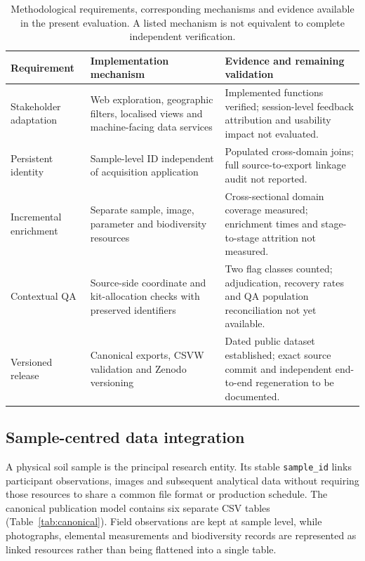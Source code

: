 \documentclass[11pt,a4paper]{article}
\newcommand{\code}[1]{\texttt{#1}}
\begin{document}
\begin{table}[htbp]
\centering\small
\caption{Methodological requirements, corresponding mechanisms and evidence available in the present evaluation. A listed mechanism is not equivalent to complete independent verification.}
\label{tab:requirements}
\begin{tabularx}{\linewidth}{@{}p{2.5cm}p{4.0cm}X@{}}
\toprule
Requirement & Implementation mechanism & Evidence and remaining validation \\
\midrule
Stakeholder adaptation & Web exploration, geographic filters, localised views and machine-facing data services & Implemented functions verified; session-level feedback attribution and usability impact not evaluated. \\
Persistent identity & Sample-level ID independent of acquisition application & Populated cross-domain joins; full source-to-export linkage audit not reported. \\
Incremental enrichment & Separate sample, image, parameter and biodiversity resources & Cross-sectional domain coverage measured; enrichment times and stage-to-stage attrition not measured. \\
Contextual QA & Source-side coordinate and kit-allocation checks with preserved identifiers & Two flag classes counted; adjudication, recovery rates and QA population reconciliation not yet available. \\
Versioned release & Canonical exports, CSVW validation and Zenodo versioning & Dated public dataset established; exact source commit and independent end-to-end regeneration to be documented. \\
\bottomrule
\end{tabularx}
\end{table}

\subsection{Sample-centred data integration}
A physical soil sample is the principal research entity. Its stable \code{sample\_id} links participant observations, images and subsequent analytical data without requiring those resources to share a common file format or production schedule. The canonical publication model contains six separate CSV tables (Table~\ref{tab:canonical}). Field observations are kept at sample level, while photographs, elemental measurements and biodiversity records are represented as linked resources rather than being flattened into a single table.
\end{document}
